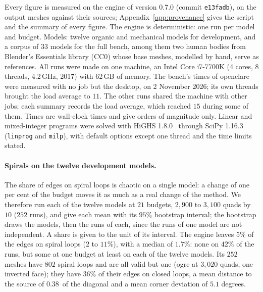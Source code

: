 \documentclass[11pt,a4paper]{article}
\begin{document}
Every figure is measured on the engine of version 0.7.0 (commit
\texttt{e13fadb}), on the output meshes against their sources;
Appendix~\ref{app:provenance} gives the script and the summary of every
figure. The engine is deterministic: one run per model and budget. Models:
twelve organic and mechanical models for development, and a corpus of $33$
models for the full bench, among them two human bodies from Blender's
Essentials library (CC0) whose base meshes, modelled by hand, serve as
references. All runs were made on one machine, an Intel Core i7-7700K (4
cores, 8 threads, 4.2\,GHz, 2017) with 62\,GB of memory. The bench's times
of openclare were measured with no job but the desktop, on 2 November 2026; its own
threads brought the load average to $11$. The other runs shared the machine
with other jobs; each summary records the load average, which reached $15$
during some of them. Times are wall-clock times and give orders of magnitude
only.
Linear and mixed-integer
programs were solved with HiGHS 1.8.0~\cite{huangfu2018highs} through SciPy
1.16.3~\cite{virtanen2020scipy} (\texttt{linprog} and \texttt{milp}), with
default options except one thread and the time limits stated.

\paragraph{Spirals on the twelve development models.}
The share of edges on spiral loops is chaotic on a single model: a change of
one per cent of the budget moves it as much as a real change of the method.
We therefore run each of the twelve models at $21$ budgets, $2{,}900$ to
$3{,}100$ quads by $10$ ($252$ runs), and give each mean with its $95\%$
bootstrap interval; the bootstrap draws the models, then the runs of each,
since the runs of one model are not independent. A share is given to the unit
of its interval. The engine leaves $5\%$ of the edges on spiral loops ($2$ to
$11\%$), with a median of $1.7\%$: none on $42\%$ of the runs, but some at
one budget at least on each of the twelve models. Its $252$ meshes have $802$
spiral loops and are all valid but one (ogre at $3{,}020$ quads, one
inverted face); they have $36\%$ of their edges on closed loops, a mean
distance to the source of $0.38$\textperthousand\ of the diagonal and a mean
corner deviation of $5.1$ degrees.
\end{document}
